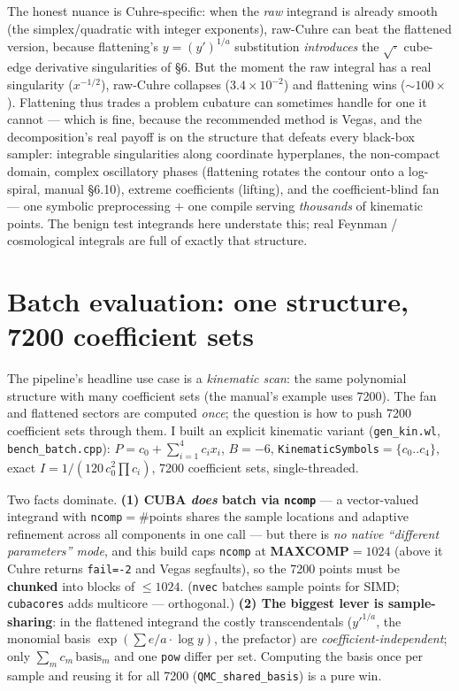 \documentclass[11pt,a4paper]{article}
\begin{document}
The honest nuance is Cuhre-specific: when the \emph{raw} integrand is already
smooth (the simplex/quadratic with integer exponents), raw-Cuhre can beat the
flattened version, because flattening's $y=(y')^{1/a}$ substitution
\emph{introduces} the $\sqrt{\cdot}$ cube-edge derivative singularities of \S6.
But the moment the raw integral has a real singularity ($x^{-1/2}$), raw-Cuhre
collapses ($3.4\times10^{-2}$) and flattening wins (${\sim}100\times$). Flattening
thus trades a problem cubature can sometimes handle for one it cannot --- which is
fine, because the recommended method is Vegas, and the decomposition's real
payoff is on the structure that defeats every black-box sampler: integrable
singularities along coordinate hyperplanes, the non-compact domain, complex
oscillatory phases (flattening rotates the contour onto a log-spiral, manual
\S6.10), extreme coefficients (lifting), and the coefficient-blind fan --- one
symbolic preprocessing $+$ one compile serving \emph{thousands} of kinematic
points. The benign test integrands here understate this; real Feynman /
cosmological integrals are full of exactly that structure.

\section{Batch evaluation: one structure, 7200 coefficient sets}
The pipeline's headline use case is a \emph{kinematic scan}: the same polynomial
structure with many coefficient sets (the manual's example uses 7200). The fan
and flattened sectors are computed \emph{once}; the question is how to push 7200
coefficient sets through them. I built an explicit kinematic variant
(\texttt{gen\_kin.wl}, \texttt{bench\_batch.cpp}): $P=c_0+\sum_{i=1}^4 c_i x_i$,
$B=-6$, \texttt{KinematicSymbols}$=\{c_0..c_4\}$, exact
$I=1/(120\,c_0^2\prod c_i)$, 7200 coefficient sets, single-threaded.

Two facts dominate. \textbf{(1) CUBA \emph{does} batch via \texttt{ncomp}} --- a
vector-valued integrand with \texttt{ncomp}$=$\#points shares the sample
locations and adaptive refinement across all components in one call --- but there
is \emph{no native ``different parameters'' mode}, and this build caps
\texttt{ncomp} at \textbf{MAXCOMP$=1024$} (above it Cuhre returns \texttt{fail=-2}
and Vegas segfaults), so the 7200 points must be \textbf{chunked} into blocks of
$\le1024$. (\texttt{nvec} batches sample points for SIMD; \texttt{cubacores} adds
multicore --- orthogonal.) \textbf{(2) The biggest lever is sample-sharing}: in
the flattened integrand the costly transcendentals ($y'^{1/a}$, the monomial
basis $\exp(\sum e/a\cdot\log y)$, the prefactor) are
\emph{coefficient-independent}; only $\sum_m c_m\,\mathrm{basis}_m$ and one
\texttt{pow} differ per set. Computing the basis once per sample and reusing it
for all 7200 (\texttt{QMC\_shared\_basis}) is a pure win.
\end{document}
